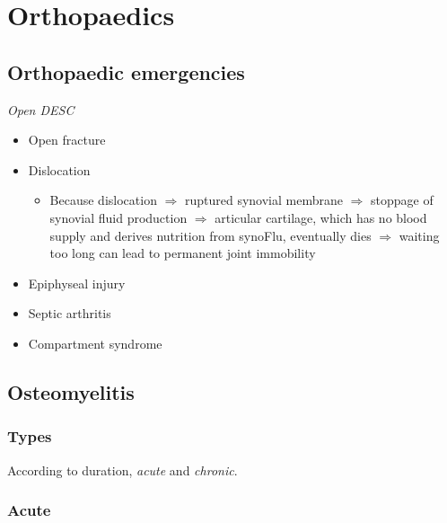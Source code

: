\documentclass[
  12pt,
]{memoir}
\providecommand{\tightlist}{%
  \setlength{\itemsep}{0pt}\setlength{\parskip}{0pt}}
\begin{document}
\pagebreak

\hypertarget{orthopaedics}{%
\chapter{Orthopaedics}\label{orthopaedics}}

\hypertarget{orthopaedic-emergencies}{%
\section{Orthopaedic emergencies}\label{orthopaedic-emergencies}}

\emph{Open DESC}

\begin{itemize}
\tightlist
\item
  Open fracture
\item
  Dislocation

  \begin{itemize}
  \tightlist
  \item
    Because dislocation \(\Rightarrow\) ruptured synovial membrane
    \(\Rightarrow\) stoppage of synovial fluid production
    \(\Rightarrow\) articular cartilage, which has no blood supply and
    derives nutrition from synoFlu, eventually dies \(\Rightarrow\)
    waiting too long can lead to permanent joint immobility
  \end{itemize}
\item
  Epiphyseal injury
\item
  Septic arthritis
\item
  Compartment syndrome
\end{itemize}

\pagebreak

\hypertarget{osteomyelitis}{%
\section{Osteomyelitis}\label{osteomyelitis}}

\hypertarget{types-2}{%
\subsection{Types}\label{types-2}}

According to duration, \emph{acute} and \emph{chronic}.

\hypertarget{acute}{%
\subsection{Acute}\label{acute}}
\end{document}
